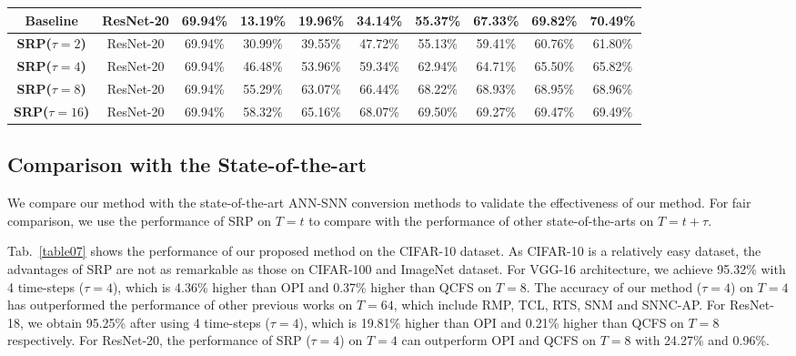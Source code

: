\documentclass[letterpaper]{article} %
\begin{document}
\begin{table}[]
\begin{tabular}{cccccccccc}
    Baseline & ResNet-20 & 69.94\% & 13.19\% & 19.96\% & 34.14\% & 55.37\% & 67.33\% & 69.82\% & 70.49\% \\\hline
	\textbf{SRP($\tau=2$)} & ResNet-20 & 69.94\% & 30.99\% & 39.55\% & 47.72\% & 55.13\% & 59.41\% & 60.76\% & 61.80\% \\ \hline
	\textbf{SRP($\tau=4$)} & ResNet-20 & 69.94\% & 46.48\% & 53.96\% & 59.34\% & 62.94\% & 64.71\% & 65.50\% & 65.82\% \\ \hline
	\textbf{SRP($\tau=8$)} & ResNet-20 & 69.94\% & 55.29\% & 63.07\% & 66.44\% & 68.22\% & 68.93\% & 68.95\% & 68.96\% \\ \hline
	\textbf{SRP($\tau=16$)} & ResNet-20 & 69.94\% & 58.32\% & 65.16\% & 68.07\% & 69.50\% & 69.27\% & 69.47\% & 69.49\% \\ \hline
	\end{tabular}
	\label{table06}
\end{table}




\subsection{Comparison with the State-of-the-art}
We compare our method with the state-of-the-art ANN-SNN conversion methods to validate the effectiveness of our method. For fair comparison, we use the performance of SRP on $T=t$ to compare with the performance of other state-of-the-arts on $T=t+\tau$. 


Tab.~\ref{table07} shows the performance of our proposed method on the CIFAR-10 dataset. As CIFAR-10 is a relatively easy dataset, the advantages of SRP are not as remarkable as those on CIFAR-100 and ImageNet dataset. For VGG-16 architecture, we achieve 95.32\% with 4 time-steps ($\tau=4$), which is 4.36\% higher than OPI and 0.37\% higher than QCFS on $T=8$. The accuracy of our method ($\tau=4$) on $T=4$ has outperformed the performance of other previous works on $T=64$, which include RMP, TCL, RTS, SNM and SNNC-AP. For ResNet-18, we obtain 95.25\% after using 4 time-steps ($\tau=4$), which is 19.81\% higher than OPI and 0.21\% higher than QCFS on $T=8$ respectively. For ResNet-20, the performance of SRP ($\tau=4$) on $T=4$ can outperform OPI and QCFS on $T=8$ with 24.27\% and 0.96\%.
\end{document}
